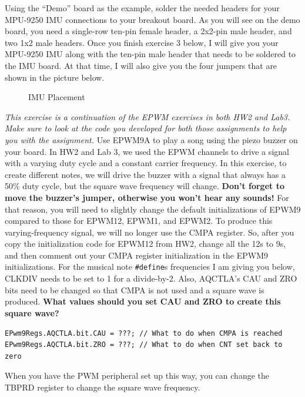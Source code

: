 \documentclass[11pt]{article}
\begin{document}
%
\MakeAssignmentTitle


Using the “Demo” board as the example, solder the needed headers for your MPU-9250 IMU connections to your breakout board. As you will see on the demo board, you need a single-row ten-pin female header, a 2x2-pin male header, and two 1x2 male headers. Once you finish exercise 3 below, I will give you your MPU-9250 IMU along with the ten-pin male header that needs to be soldered to the IMU board. At that time, I will also give you the four jumpers that are shown in the picture below.
%
\begin{figure}[H]
    \centering
    \caption{IMU Placement}
    \label{fig:placeholder}
\end{figure}
%

\textit{This exercise is a continuation of the EPWM exercises in both HW2 and Lab3. Make sure to look at the code you developed for both those assignments to help you with the assignment.} Use EPWM9A to play a song using the piezo buzzer on your board. In HW2 and Lab 3, we used the EPWM channels to drive a signal with a varying duty cycle and a constant carrier frequency. In this exercise, to create different notes, we will drive the buzzer with a signal that always has a 50\% duty cycle, but the square wave frequency will change. \textbf{Don't forget to move the buzzer's jumper, otherwise you won't hear any sounds!} For that reason, you will need to slightly change the default initializations of EPWM9 compared to those for EPWM12, EPWM1, and EPWM2. To produce this varying-frequency signal, we will no longer use the CMPA register. So, after you copy the initialization code for EPWM12 from HW2, change all the 12s to 9s, and then comment out your CMPA register initialization in the EPWM9 initializations. For the musical note \texttt{#define}s frequencies I am giving you below, CLKDIV needs to be set to 1 for a divide-by-2. Also, AQCTLA’s CAU and ZRO bits need to be changed so that CMPA is not used and a square wave is produced. \textbf{What values should you set CAU and ZRO to create this square wave?}
%
\begin{verbatim}
EPwm9Regs.AQCTLA.bit.CAU = ???; // What to do when CMPA is reached
EPwm9Regs.AQCTLA.bit.ZRO = ???; // What to do when CNT set back to zero
\end{verbatim}
%
When you have the PWM peripheral set up this way, you can change the TBPRD register to change the square wave frequency.
\end{document}
